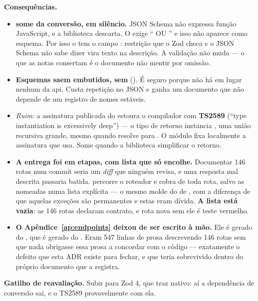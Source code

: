 \textbf{Consequências.}
\begin{itemize}
  \item \textbf{ some da conversão, em silêncio.} JSON Schema não
    expressa função JavaScript, e a biblioteca descarta. O
     exige \enquote{ OU
    } e isso não aparece como esquema. Por isso o 
    tem o campo : restrição que o Zod checa e o JSON Schema não sabe
    dizer vira texto na descrição. A validação não muda --- o que as notas
    consertam é o documento não mentir por omissão.
  \item \textbf{Esquemas saem embutidos, sem }
    (). É seguro porque não há  em lugar
    nenhum da api. Custa repetição no JSON e ganha um documento que não depende
    de um registro de nomes estáveis.
  \item \emph{Ruim}: a assinatura publicada do  estoura o
    compilador com \textbf{TS2589} (\enquote{type instantiation is excessively
    deep}) --- o tipo de retorno instancia , uma união
    recursiva grande, mesmo quando  resolve para
    . O módulo fixa localmente a assinatura que usa. Some quando a
    biblioteca simplificar o retorno.
  \item \textbf{A entrega foi em etapas, com lista que só encolhe.} Documentar
    146 rotas num commit seria um \emph{diff} que ninguém revisa, e uma resposta
    mal descrita passaria batida.  percorre o
    roteador e cobra  de toda rota, salvo as nomeadas numa lista
    explícita --- o mesmo molde do  de
    , com a diferença de que aquelas exceções são
    permanentes e estas eram dívida. \textbf{A lista está vazia}: as 146 rotas
    declaram contrato, e rota nova sem ele é teste vermelho.
  \item \textbf{O Apêndice~\ref{ap:endpoints} deixou de ser escrito à mão.} Ele
    é gerado do , que é gerado do . Eram
    547 linhas de prosa descrevendo 146 rotas sem que nada obrigasse essa prosa a
    concordar com o código --- exatamente o defeito que esta ADR existe para
    fechar, e que teria sobrevivido dentro do próprio documento que a registra.
\end{itemize}

\textbf{Gatilho de reavaliação.} Subir para Zod 4, que traz
 nativo: aí a dependência de conversão sai, e o TS2589
provavelmente com ela.

